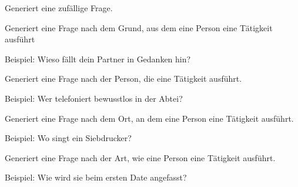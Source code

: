 \documentclass[a4paper,12pt,oneside]{sphinxmanual}
\begin{document}

\begin{fulllineitems}
\label{module:pyzufall.satz.satz_frage}
Generiert eine zufällige Frage.

\end{fulllineitems}


\begin{fulllineitems}
\label{module:pyzufall.satz.satz_frage_1}
Generiert eine Frage nach dem Grund, aus dem eine Person eine Tätigkeit ausführt

Beispiel: Wieso fällt dein Partner in Gedanken hin?

\end{fulllineitems}


\begin{fulllineitems}
\label{module:pyzufall.satz.satz_frage_2}
Generiert eine Frage nach der Person, die eine Tätigkeit ausführt.

Beispiel: Wer telefoniert bewusstlos in der Abtei?

\end{fulllineitems}


\begin{fulllineitems}
\label{module:pyzufall.satz.satz_frage_3}
Generiert eine Frage nach dem Ort, an dem eine Person eine Tätigkeit ausführt.

Beispiel: Wo singt ein Siebdrucker?

\end{fulllineitems}


\begin{fulllineitems}
\label{module:pyzufall.satz.satz_frage_4}
Generiert eine Frage nach der Art, wie eine Person eine Tätigkeit ausführt.

Beispiel: Wie wird sie beim ersten Date angefasst?

\end{fulllineitems}
\end{document}
